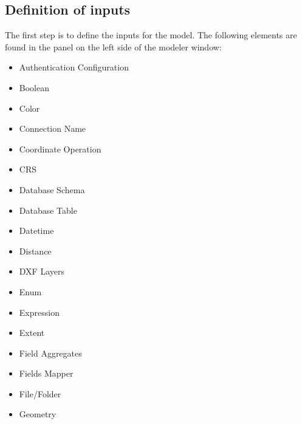 \documentclass[letterpaper,10pt,english]{sphinxmanual}
\begin{document}
\subsection{Definition of inputs}
\label{\detokenize{Introduction/models:definition-of-inputs}}
\sphinxAtStartPar
The first step is to define the inputs for the model.
The following elements are found in the  panel on
the left side of the modeler window:
\begin{itemize}
\item {} 
\sphinxAtStartPar
Authentication Configuration

\item {} 
\sphinxAtStartPar
Boolean

\item {} 
\sphinxAtStartPar
Color

\item {} 
\sphinxAtStartPar
Connection Name

\item {} 
\sphinxAtStartPar
Coordinate Operation

\item {} 
\sphinxAtStartPar
CRS

\item {} 
\sphinxAtStartPar
Database Schema

\item {} 
\sphinxAtStartPar
Database Table

\item {} 
\sphinxAtStartPar
Datetime

\item {} 
\sphinxAtStartPar
Distance

\item {} 
\sphinxAtStartPar
DXF Layers

\item {} 
\sphinxAtStartPar
Enum

\item {} 
\sphinxAtStartPar
Expression

\item {} 
\sphinxAtStartPar
Extent

\item {} 
\sphinxAtStartPar
Field Aggregates

\item {} 
\sphinxAtStartPar
Fields Mapper

\item {} 
\sphinxAtStartPar
File/Folder

\item {} 
\sphinxAtStartPar
Geometry


\end{itemize}
\end{document}
